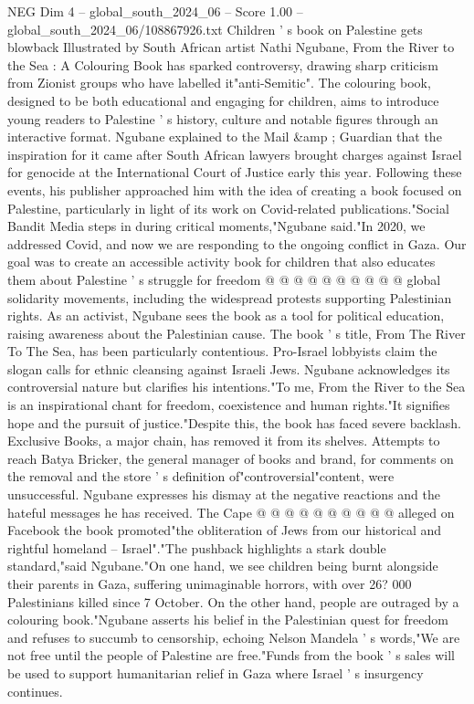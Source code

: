 \begin{textsample}{NEG Dim 4 – global\_south\_2024\_06 – Score 1.00 – global\_south\_2024\_06/108867926.txt}  \label{ex:f4_neg_379}
Children ' s book on Palestine gets blowback Illustrated by South African artist Nathi Ngubane, From the River to the Sea : A Colouring Book has sparked controversy, drawing sharp criticism from Zionist groups who have labelled it"anti-Semitic".
The colouring book, designed to be both educational and engaging for children, aims to introduce young readers to Palestine ' s history, culture and notable figures through an interactive format.
Ngubane explained to the Mail \&amp ; Guardian that the inspiration for it came after South African lawyers brought charges against Israel for genocide at the International Court of Justice early this year.
Following these events, his publisher approached him with the idea of creating a book focused on Palestine, particularly in light of its work on Covid-related publications."Social Bandit Media steps in during critical moments,"Ngubane said."In 2020, we addressed Covid, and now we are responding to the ongoing conflict in Gaza.
Our goal was to create an accessible activity book for children that also educates them about Palestine ' s struggle for freedom @ @ @ @ @ @ @ @ @ @ global solidarity movements, including the widespread protests supporting Palestinian rights.
As an activist, Ngubane sees the book as a tool for political education, raising awareness about the Palestinian cause.
The book ' s title, From The River To The Sea, has been particularly contentious.
Pro-Israel lobbyists claim the slogan calls for ethnic cleansing against Israeli Jews.
Ngubane acknowledges its controversial nature but clarifies his intentions."To me, From the River to the Sea is an inspirational chant for freedom, coexistence and human rights."It signifies hope and the pursuit of justice."Despite this, the book has faced severe backlash.
Exclusive Books, a major chain, has removed it from its shelves.
Attempts to reach Batya Bricker, the general manager of books and brand, for comments on the removal and the store ' s definition of"controversial"content, were unsuccessful.
Ngubane expresses his dismay at the negative reactions and the hateful messages he has received.
The Cape @ @ @ @ @ @ @ @ @ @ alleged on Facebook the book promoted"the obliteration of Jews from our historical and rightful homeland -- Israel"."The pushback highlights a stark double standard,"said Ngubane."On one hand, we see children being burnt alongside their parents in Gaza, suffering unimaginable horrors, with over 26? 000 Palestinians killed since 7 October.
On the other hand, people are outraged by a colouring book."Ngubane asserts his belief in the Palestinian quest for freedom and refuses to succumb to censorship, echoing Nelson Mandela ' s words,"We are not free until the people of Palestine are free."Funds from the book ' s sales will be used to support humanitarian relief in Gaza where Israel ' s insurgency continues.

\end{textsample}
